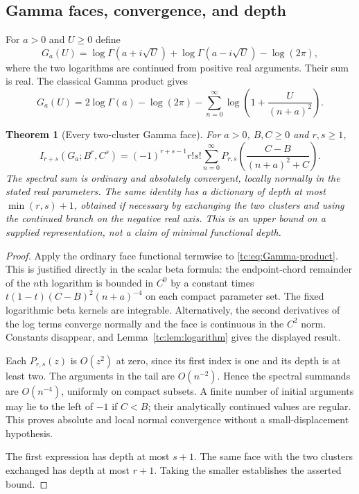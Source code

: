 \documentclass[11pt,a4paper]{article}
\numberwithin{equation}{section}
\newtheorem{theorem}{Theorem}[section]
\theoremstyle{definition}
\theoremstyle{remark}
\begin{document}
\subsection{Gamma faces, convergence, and depth}

For $a>0$ and $U\ge0$ define
\begin{equation}\label{tc:eq:G}
 G_a(U)=\log\Gamma(a+i\sqrt U)+\log\Gamma(a-i\sqrt U)
                      -\log(2\pi),
\end{equation}
where the two logarithms are continued from positive real arguments.
Their sum is real.  The classical Gamma product
\cite{dlmfgamma} gives
\begin{equation}\label{tc:eq:Gamma-product}
 G_a(U)=2\log\Gamma(a)-\log(2\pi)
          -\sum_{n=0}^{\infty}
                    \log\left(1+\frac{U}{(n+a)^2}\right).
\end{equation}

\begin{theorem}[Every two-cluster Gamma face]
\label{tc:thm:Gamma}
For $a>0$, $B,C\ge0$ and $r,s\ge1$,
\begin{equation}\label{tc:eq:Gamma-dictionary}
 \boxed{\displaystyle
 I_{r+s}(G_a;B^r,C^s)
   =(-1)^{r+s-1}r!s!
      \sum_{n=0}^{\infty}
       P_{r,s}\!\left(\frac{C-B}{(n+a)^2+C}\right).}
\end{equation}
The spectral sum is ordinary and absolutely convergent, locally
normally in the stated real parameters.  The same identity has a
dictionary of depth at most $\min(r,s)+1$, obtained if necessary by
exchanging the two clusters and using the continued branch on
the negative real axis.  This is an upper bound on a supplied
representation, not a claim of minimal functional depth.
\end{theorem}

\begin{proof}
Apply the ordinary face functional termwise to
\eqref{tc:eq:Gamma-product}.  This is justified directly in the
scalar beta formula: the endpoint-chord remainder of the $n$th
logarithm is bounded in $C^0$ by a constant times
$t(1-t)(C-B)^2(n+a)^{-4}$ on each compact parameter set.
The fixed logarithmic beta kernels are integrable.  Alternatively,
the second derivatives of the log terms converge normally and the
face is continuous in the $C^2$ norm.  Constants disappear, and
Lemma~\ref{tc:lem:logarithm} gives the displayed result.

Each $P_{r,s}(z)$ is $O(z^2)$ at zero, since its first index is one
and its depth is at least two.  The arguments in the tail are
$O(n^{-2})$.  Hence the spectral summands are $O(n^{-4})$,
uniformly on compact subsets.  A finite number of initial arguments
may lie to the left of $-1$ if $C<B$; their analytically continued
values are regular.  This proves absolute and local normal
convergence without a small-displacement hypothesis.

The first expression has depth at most $s+1$.
The same face with the two clusters exchanged has depth at most
$r+1$.  Taking the smaller establishes the asserted bound.
\end{proof}
\end{document}
